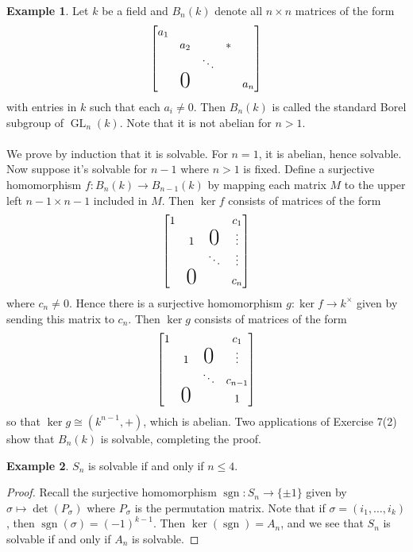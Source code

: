 \documentclass[10pt,letterpaper,cm]{nupset}
\theoremstyle{definition}
\newtheorem{exmp}{Example}
\newcommand{\1}{\mathbf{1}}
\newcommand{\0}{\vec 0}
\DeclareMathOperator*{\GL}{GL}
\DeclareMathOperator{\sgn}{sgn}
\begin{document}
\begin{exmp}
Let $k$ be a field and  $B_n(k)$ denote all $n\times n$ matrices of the form
\[
  \left[
    \begin{matrix}
       a_1 & & &  &\\
       & a_2 & & \ast  \\
       & & \ddots & & \\
       & \text{\huge0}  & & & a_{n} 
\\
    \end{matrix}
  \right]
\] with entries in $k$ such that each $a_i \ne 0$. Then $B_n(k)$ is called the standard Borel subgroup of $\GL_n(k)$. Note that it is not abelian for $n>1$. 
\\ \\ We prove by induction that it is solvable.  For $n=1$, it is abelian, hence solvable. Now suppose it's solvable for $n-1$ where $n>1$ is fixed. Define a surjective homomorphism $f: B_n(k) \to B_{n-1}(k)$ by mapping each matrix $M$ to the upper left $n-1 \times n-1$ included in $M$. Then $\ker f$ consists of matrices of the form
\[
  \left[
    \begin{matrix}
       1 & & &  c_1\\
       & 1 &  \text{\huge0} & \vdots \\
       & & \ddots & \vdots  \\
        & \text{\huge0}  & &  c_{n} 
\\
    \end{matrix}
  \right]
\] where $c_{n} \ne 0$. Hence there is a surjective homomorphism $g: \ker f \to k^{\times}$ given by sending this matrix to $c_n$. Then $\ker g$ consists of matrices of the form
\[
  \left[
    \begin{matrix}
       1 & & &  c_1\\
       & 1 &  \text{\huge0} & \vdots \\
       & & \ddots & c_{n-1}  \\
        & \text{\huge0}  & &  1 
\\
    \end{matrix}
  \right]
  \] so that $\ker g \cong (k^{n-1}, +)$, which is abelian.  Two applications of Exercise 7(2) show that $B_n(k)$ is solvable, completing the proof.
\end{exmp}

\begin{exmp}
$S_n$ is solvable  if and only if $n\leq 4$.
\end{exmp}

\begin{proof}
Recall the surjective homomorphism $\sgn: S_n \to \{\pm 1\}$ given by $\sigma \mapsto \det(P_\sigma)$ where $P_\sigma$ is the permutation matrix. Note that if $\sigma = (i_1, \ldots, i_k)$, then $\sgn(\sigma) = (-1)^{k-1}$. Then $\ker(\sgn) = A_n$, and we see that $S_n$ is solvable  if and only if $A_n$ is solvable. 
\end{proof}
\end{document}
